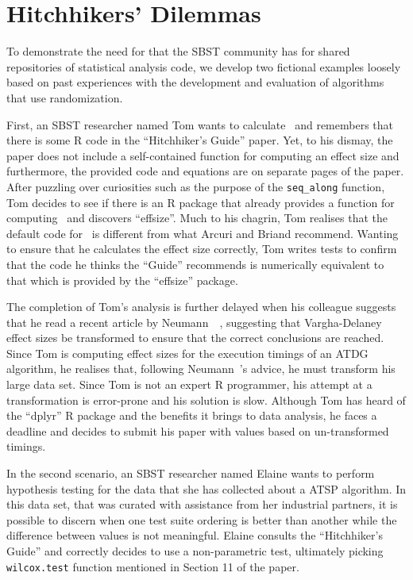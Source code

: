 
\section{Hitchhikers' Dilemmas}
\label{sec:dilemma}

To demonstrate the need for that the SBST community has for shared repositories of statistical analysis code, we develop
two fictional examples loosely based on past experiences with the development and evaluation of algorithms that use
randomization.

First, an SBST researcher named Tom wants to calculate \atwelve~and remembers that there is some R code in the
``Hitchhiker's Guide'' paper. Yet, to his dismay, the paper does not include a self-contained function for computing an
effect size and furthermore, the provided code and equations are on separate pages of the paper. After puzzling over
curiosities such as the purpose of the {\tt seq\_along} function, Tom decides to see if there is an R package that
already provides a function for computing \atwelve~and discovers ``effsize''. Much to his chagrin, Tom realises that the
default code for \atwelve~is different from what Arcuri and Briand recommend. Wanting to ensure that he calculates the
effect size correctly, Tom writes tests to confirm that the code he thinks the ``Guide'' recommends is numerically
equivalent to that which is provided by the ``effsize'' package.

The completion of Tom's analysis is further delayed when his colleague suggests that he read a recent article by
Neumann~\etal~\cite{Neumann2015}, suggesting that Vargha-Delaney effect sizes be transformed to ensure that the correct
conclusions are reached. Since Tom is computing effect sizes for the execution timings of an ATDG algorithm, he realises
that, following Neumann~\etal's advice, he must transform his large data set. Since Tom is not an expert R programmer,
his attempt at a transformation is error-prone and his solution is slow. Although Tom has heard of the ``dplyr''
R package and the benefits it brings to data analysis, he faces a deadline and decides to submit his paper with
\atwelve values based on un-transformed timings.

In the second scenario, an SBST researcher named Elaine wants to perform hypothesis testing for the data that she has
collected about a ATSP algorithm. In this data set, that was curated with assistance from her industrial partners, it is
possible to discern when one test suite ordering is better than another while the difference between values is not
meaningful. Elaine consults the ``Hitchhiker's Guide'' and correctly decides to use a non-parametric test, ultimately
picking {\tt wilcox.test} function mentioned in Section 11 of the paper.



